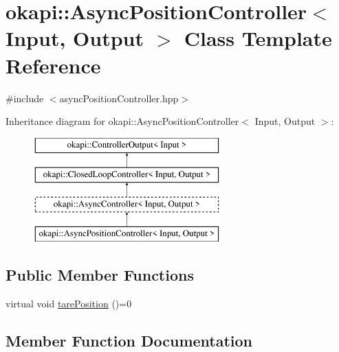 \hypertarget{classokapi_1_1AsyncPositionController}{}\section{okapi\+::Async\+Position\+Controller$<$ Input, Output $>$ Class Template Reference}
\label{classokapi_1_1AsyncPositionController}


{\ttfamily \#include $<$async\+Position\+Controller.\+hpp$>$}

Inheritance diagram for okapi\+::Async\+Position\+Controller$<$ Input, Output $>$\+:\begin{figure}[H]
\begin{center}
\leavevmode
\includegraphics[height=4.000000cm]{classokapi_1_1AsyncPositionController}
\end{center}
\end{figure}
\subsection*{Public Member Functions}
\begin{DoxyCompactItemize}
\item 
virtual void \mbox{\hyperlink{classokapi_1_1AsyncPositionController_a0af03d0035343cbf843a19374f38a059}{tare\+Position}} ()=0
\end{DoxyCompactItemize}


\subsection{Member Function Documentation}
\mbox{\label{classokapi_1_1AsyncPositionController_a0af03d0035343cbf843a19374f38a059}} 
